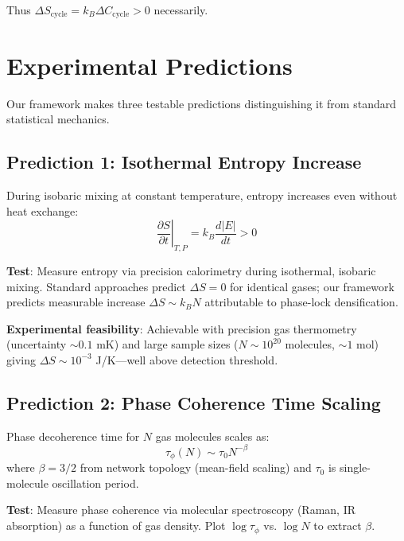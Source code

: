 Thus $\Delta S_{\text{cycle}} = k_B \Delta C_{\text{cycle}} > 0$ necessarily.

\section{Experimental Predictions}
\label{sec:predictions}

Our framework makes three testable predictions distinguishing it from standard statistical mechanics.

\subsection{Prediction 1: Isothermal Entropy Increase}

\begin{theorem}
During isobaric mixing at constant temperature, entropy increases even without heat exchange:
\begin{equation}
\left.\frac{\partial S}{\partial t}\right|_{T,P} = k_B \frac{d|E|}{dt} > 0
\end{equation}
\end{theorem}

\textbf{Test}: Measure entropy via precision calorimetry during isothermal, isobaric mixing. Standard approaches predict $\Delta S = 0$ for identical gases; our framework predicts measurable increase $\Delta S \sim k_B N$ attributable to phase-lock densification.

\textbf{Experimental feasibility}: Achievable with precision gas thermometry (uncertainty $\sim 0.1$ mK) and large sample sizes ($N \sim 10^{20}$ molecules, $\sim 1$ mol) giving $\Delta S \sim 10^{-3}$ J/K—well above detection threshold.

\subsection{Prediction 2: Phase Coherence Time Scaling}

\begin{proposition}
Phase decoherence time for $N$ gas molecules scales as:
\begin{equation}
\tau_{\phi}(N) \sim \tau_0 N^{-\beta}
\end{equation}
where $\beta = 3/2$ from network topology (mean-field scaling) and $\tau_0$ is single-molecule oscillation period.
\end{proposition}

\textbf{Test}: Measure phase coherence via molecular spectroscopy (Raman, IR absorption) as a function of gas density. Plot $\log \tau_{\phi}$ vs. $\log N$ to extract $\beta$.

